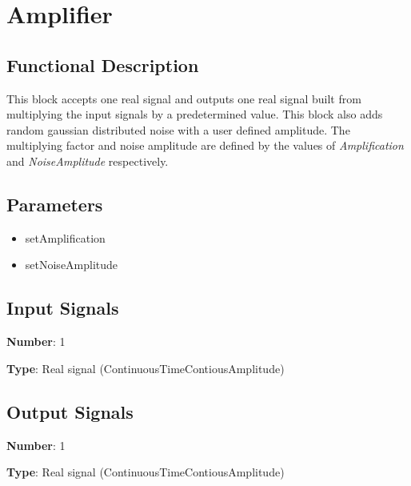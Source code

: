 \section{Amplifier}

\subsection*{Functional Description}

This block accepts one real signal and outputs one real signal built from multiplying the input signals by a predetermined value. This block also adds random gaussian distributed noise with a user defined amplitude. The multiplying factor and noise amplitude are defined by the values of \textit{Amplification} and \textit{NoiseAmplitude} respectively.


\subsection*{Parameters}

\begin{multicols}{2}
	\begin{itemize}
		\item setAmplification
		\item setNoiseAmplitude
	\end{itemize}
\end{multicols}

\subsection*{Input Signals}

\textbf{Number}: 1

\textbf{Type}: Real signal (ContinuousTimeContiousAmplitude)

\subsection*{Output Signals}

\textbf{Number}: 1

\textbf{Type}: Real signal (ContinuousTimeContiousAmplitude)